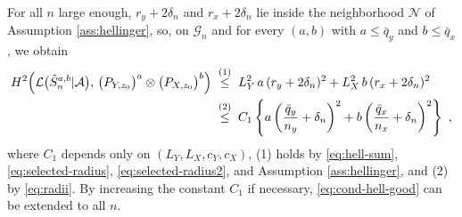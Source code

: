 \documentclass[11pt]{article}
\numberwithin{equation}{section}
\begin{document}
For all $n$ large enough, $r_y+2\delta_n$ and $r_x+2\delta_n$ lie inside the neighborhood $\mathcal N$ of Assumption \ref{ass:hellinger}, so, on $\mathcal{G}_n$ and for every $(a,b)$ with $a\le\bar q_y$ and $b\le\bar q_x$, we obtain
\begin{align}
 H^2\Big( \mathcal L\big(\hat S_n^{a,b}|\mathcal A\big),\,
 \big(P_{Y,z_0}\big)^{a}\otimes\big(P_{X,z_0}\big)^{b} \Big)
 &\;\overset{(1)}{\le}\; L_Y^2\,a\,(r_y+2\delta_n)^2+L_X^2\,b\,(r_x+2\delta_n)^2\notag\\
 &\;\overset{(2)}{\le}\; C_1\left\{a\left(\frac{\bar q_y}{n_y}+\delta_n\right)^{2}
 +b\left(\frac{\bar q_x}{n_x}+\delta_n\right)^{2}\right\}~,\label{eq:cond-hell-good}
\end{align}
where $C_1$ depends only on $(L_Y,L_X,c_Y,c_X)$, (1) holds by \eqref{eq:hell-sum}, \eqref{eq:selected-radius}, \eqref{eq:selected-radius2}, and Assumption \ref{ass:hellinger}, and (2) by \eqref{eq:radii}. By increasing the constant $C_1$ if necessary, \eqref{eq:cond-hell-good} can be extended to all $n$.
\end{document}
